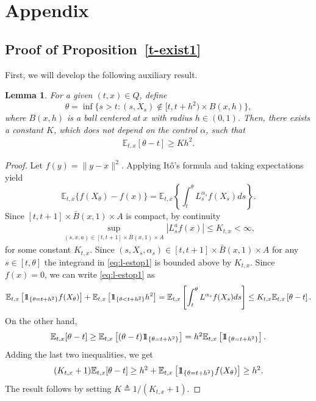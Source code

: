 \documentclass[11pt,reqno]{amsart}
\numberwithin{equation}{section}
\newtheorem{lem}{Lemma}[section]
\def\one{{\hbox{1{\kern -0.35em}1}}}
\begin{document}
\section{Appendix}\label{ss-exist}

\subsection{ Proof of Proposition~\ref{t-exist1}} 
First, we will develop the following auxiliary result.

\begin{lem}
  \label{l-estop}
For a given $ (t,x) \in Q$, define $$\theta= \inf\{s>t: (s,
X_s) \notin [t,t+h^2) \times B(x,h)\},$$ where $B(x,h)$ is a ball centered at $x$ with radius $h \in (0,1)$.  Then, 
there exists a constant $K$, which does not depend on the control $\alpha$, such that
$$\begin{array}{ll}
  \mathbb{E}_{t,x} [\theta -t] \ge K h^2. 
\end{array}$$
\end{lem}
\begin{proof}
  Let 
  $f(y) = \|y-x\|^2$.  
  Applying It\^{o}'s formula and taking expectations yield
   \begin{equation}\label{eq:l-estop1}
    \mathbb{E}_{t,x}\{ f(X_{\theta}) - f(x) \} = \mathbb{E}_{t,x} \left\{
    \int_t^\theta L_s^{\alpha_s} f(X_s) ds\right\}.
  \end{equation}
  Since $[t,t+1] \times \bar B(x,1)
  \times A$ is compact, by continuity
  $$\begin{array}{ll}
    \displaystyle \sup_{(s,x,a) \in   [t,t+1] \times \bar B(x,1) \times
      A} |L_s^a f(x)| \le K_{t,x}
    <\infty,
  \end{array}$$
  for some constant $K_{t,x}$.
  Since $(s, X_s, \alpha_s) \in [t,t+1] \times \bar
  B(x,1) \times A $ for any $s\in [t,\theta]$ the integrand in \eqref{eq:l-estop1} is 
  bounded above by $ K_{t,x}$. Since $f(x) = 0$, we can write
  \eqref{eq:l-estop1}  as
  \begin{equation*}
    \mathbb{E}_{t,x} \left[\one_{\{\theta = t + h^2\}} f(X_{\theta})\right] + \mathbb{E}_{t,x}
   \left[ \one_{\{\theta < t+h^2\}} h^2 \right] = \mathbb{E}_{t,x} \left [\int_t^\theta
    L^{\alpha_s} f(X_s) ds \right]\le  K_{t,x} \mathbb{E}_{t,x} \left[\theta
    - t\right]. 
  \end{equation*}
  On the other hand,
  $$\begin{array}{ll}
    \mathbb{E}_{t,x} [\theta -t] \ge \mathbb{E}_{t,x} \left[(\theta - t) \one_{\{\theta
      = t + h^2\}}\right] = h^2 \mathbb{E}_{t,x} \left[ \one_{\{\theta = t + h^2\}}\right].
  \end{array}$$
  Adding the last two inequalities, we get
  $$\begin{array}{ll}
    ( K_{t,x} + 1) \mathbb{E}_{t,x} [\theta -t] \ge h^2 +
    \mathbb{E}_{t,x}\left[ \one_{\{\theta = t + h^2\}} f(X_{\theta})\right] \ge h^2 . 
  \end{array}$$
  The result follows by setting $K \triangleq 1/(K_{t,x} + 1)$. 
\end{proof}
\end{document}
